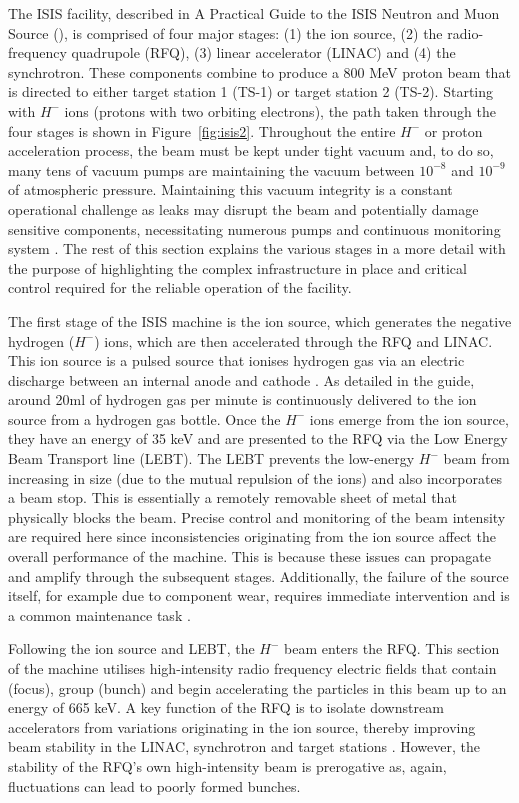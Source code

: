 \documentclass[10pt,oneside]{report}
\begin{document}
The ISIS facility, described in A Practical Guide to the ISIS Neutron and Muon Source (\citet{2021practicalguide}), is comprised of four major stages: (1) the ion source, (2) the radio-frequency quadrupole (RFQ), (3) linear accelerator (LINAC) and (4) the synchrotron. These components combine to produce a 800 MeV proton beam that is directed to either target station 1 (TS-1) or target station 2 (TS-2). Starting with $H^-$ ions (protons with two orbiting electrons), the path taken through the four stages is shown in Figure~\ref{fig:isis2}. Throughout the entire $H^-$ or proton acceleration process, the beam must be kept under tight vacuum and, to do so, many tens of vacuum pumps are maintaining the vacuum between $10^{-8}$ and $10^{-9}$ of atmospheric pressure. Maintaining this vacuum integrity is a constant operational challenge as leaks may disrupt the beam and potentially damage sensitive components, necessitating numerous pumps and continuous monitoring system \cite{2021practicalguide}. The rest of this section explains the various stages in a more detail with the purpose of highlighting the complex infrastructure in place and critical control required for the reliable operation of the facility.

The first stage of the ISIS machine is the ion source, which generates the negative hydrogen ($H^-$) ions, which are then accelerated through the RFQ and LINAC. This ion source is a pulsed source that ionises hydrogen gas via an electric discharge between an internal anode and cathode \cite{2021practicalguide}. As detailed in the guide, around 20ml of hydrogen gas per minute is continuously delivered to the ion source from a hydrogen gas bottle. Once the $H^-$ ions emerge from the ion source, they have an energy of 35 keV and are presented to the RFQ via the Low Energy Beam Transport line (LEBT). The LEBT prevents the low-energy $H^-$ beam from increasing in size (due to the mutual repulsion of the ions) and also incorporates a beam stop. This is essentially a remotely removable sheet of metal that physically blocks the beam. Precise control and monitoring of the beam intensity are required here since inconsistencies originating from the ion source affect the overall performance of the machine. This is because these issues can propagate and amplify through the subsequent stages. Additionally, the failure of the source itself, for example due to component wear, requires immediate intervention and is a common maintenance task \cite{2021practicalguide}.

Following the ion source and LEBT, the $H^-$ beam enters the RFQ. This section of the machine utilises high-intensity radio frequency electric fields that contain (focus), group (bunch) and begin accelerating the particles in this beam up to an energy of 665 keV. A key function of the RFQ is to isolate downstream accelerators from variations originating in the ion source, thereby improving beam stability in the LINAC, synchrotron and target stations \cite{2021practicalguide}. However, the stability of the RFQ's own high-intensity beam is prerogative as, again, fluctuations can lead to poorly formed bunches.
\end{document}
